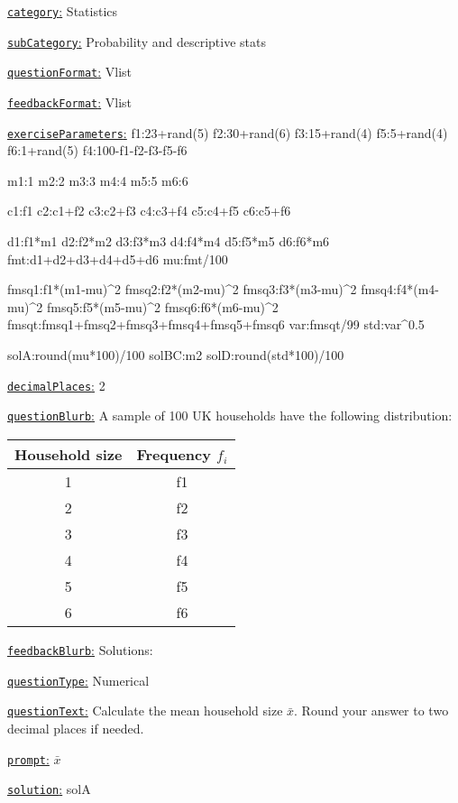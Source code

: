 \documentclass[preview]{standalone}
\newcommand \fieldname[1]{\underline{\texttt{#1}:}}
\begin{document}
\fieldname{category}  %
Statistics

\fieldname{subCategory} %
Probability and descriptive stats

\fieldname{questionFormat}
Vlist

\fieldname{feedbackFormat}
Vlist

\fieldname{exerciseParameters}
f1:23+rand(5)
f2:30+rand(6)
f3:15+rand(4)
f5:5+rand(4)
f6:1+rand(5)
f4:100-f1-f2-f3-f5-f6

m1:1
m2:2
m3:3
m4:4
m5:5
m6:6

c1:f1
c2:c1+f2
c3:c2+f3
c4:c3+f4
c5:c4+f5
c6:c5+f6

d1:f1*m1
d2:f2*m2
d3:f3*m3
d4:f4*m4
d5:f5*m5
d6:f6*m6
fmt:d1+d2+d3+d4+d5+d6
mu:fmt/100

fmsq1:f1*(m1-mu)^2
fmsq2:f2*(m2-mu)^2
fmsq3:f3*(m3-mu)^2
fmsq4:f4*(m4-mu)^2
fmsq5:f5*(m5-mu)^2
fmsq6:f6*(m6-mu)^2
fmsqt:fmsq1+fmsq2+fmsq3+fmsq4+fmsq5+fmsq6
var:fmsqt/99
std:var^0.5

solA:round(mu*100)/100
solBC:m2
solD:round(std*100)/100

\fieldname{decimalPlaces}
2

\fieldname{questionBlurb}
A sample of 100 UK households have the following distribution:

\begin{tabular}{cc}
Household size & Frequency $f_i$ \\
\hline
1 & {f1} \\
2 & {f2} \\
3 & {f3} \\
4 & {f4} \\
5 & {f5} \\
6 & {f6} \\
\hline
\end{tabular}

\fieldname{feedbackBlurb}
Solutions:

\fieldname{questionType}
Numerical

\fieldname{questionText}
Calculate the mean household size $\bar x$. Round your answer to two decimal places if needed.

\fieldname{prompt}
$\bar x$

\fieldname{solution}
solA
\end{document}
